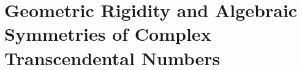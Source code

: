 \chapter{Geometric Rigidity and Algebraic Symmetries of Complex Transcendental Numbers}

\begingroup

\newcommand{\C}{\mathbb{C}}
\newcommand{\calE}{\mathcal{E}}
\newcommand{\calP}{\mathcal{P}}
\newcommand{\e}{\mathrm{e}}
\newcommand{\G}{\mathbb{G}}
\newcommand{\gtransf}{\mathcal{G}}
\newcommand{\hplane}{\mathbb{H}}
\newcommand{\id}{\mathrm{id}}
\newcommand{\N}{\mathbb{N}}
\newcommand{\Q}{\mathbb{Q}}
\newcommand{\R}{\mathbb{R}}
\newcommand{\rsphere}{\hat{\mathbb{C}}}
\newcommand{\Stab}{\operatorname{Stab}}
\newcommand{\tnum}{\mathbb{T}_{\!M}}
\newcommand{\Z}{\mathbb{Z}}
\newcommand{\aff}{\mathrm{Aff}}
\newcommand{\Ac}{\Alg}
\newcommand{\Alg}{\overline{\mathbb{Q}}}
\newcommand{\PAlg}{\mathbb{P}^{1}(\Alg)}
\newcommand{\trans}{\mathbb{T}}
\newcommand{\Tc}{\trans}
\newcommand{\orbit}{\mathcal{O}}
\newcommand{\K}{\mathbb{K}}
\newcommand{\Aut}{\operatorname{Aut}}
\newcommand{\Fix}{\operatorname{Fix}}
\newcommand{\Gal}{\operatorname{Gal}}
\newcommand{\height}{\operatorname{h}}
\newcommand{\Mu}{\operatorname{M}}
\newcommand{\PeriodicPoints}{\operatorname{Per}}
\newcommand{\PSL}{\operatorname{PSL}}
\newcommand{\SL}{\operatorname{SL}}
\newcommand{\PGL}{\operatorname{PGL}}
\newcommand{\trdeg}{\operatorname{trdeg}}
\newcommand{\Inn}{\operatorname{Inn}}
\newcommand{\Orb}{\operatorname{Orb}}
\newcommand{\Attr}{\operatorname{Attr}}
\newcommand{\attrhol}{\Attr_{\mathrm{hol}}}
\newcommand{\attranti}{\Attr_{\mathrm{anti}}}
\newcommand{\ssymm}{\Tc_{\mathrm{symm}}}
\newcommand{\sgen}{\Tc_{\mathrm{gen}}}
\newcommand{\sind}{\Tc_{\mathrm{ind}}}
\newcommand{\J}{\mathrm{conj}}
\newcommand{\gl}{\mathrm{GL}}
\newcommand{\gacircle}[4]{#1\,\lvert #4\rvert^2 + #2\,#4 + \overline{#2}\,\overline{#4} + #3}
\newcommand{\gacircleeq}[4]{\gacircle{#1}{#2}{#3}{#4}=0}

